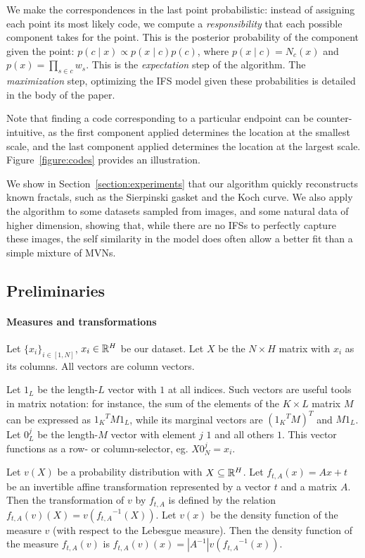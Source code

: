 We make the correspondences in the last point probabilistic: instead of assigning each point its most likely code, we compute a \emph{responsibility} that each possible component takes for the point. This is the posterior probability of the component given the point: $p(c \mid x) \propto p(x \mid c) p(c)$, where $p(x\mid c) = N_c(x)$ and $p(x) = \prod_{s \in c} w_s$. This is the \emph{expectation} step of the algorithm. The \emph{maximization} step, optimizing the IFS model given these probabilities is detailed in the body of the paper. 

Note that finding a code corresponding to a particular endpoint can be counter-intuitive, as the first component applied determines the location at the smallest scale, and the last component applied determines the location at the largest scale. Figure~\ref{figure:codes} provides an illustration.

We show in Section~\ref{section:experiments} that our algorithm quickly reconstructs known fractals, such as the Sierpinski gasket and the Koch curve. We also apply the algorithm to some datasets sampled from images, and some natural data of higher dimension, showing that, while there are no IFSs to perfectly capture these images, the self similarity in the model does often allow a better fit than a simple mixture of MVNs.

\subsection{Preliminaries}
\paragraph{Measures and transformations} Let $\{x_i\}_{i\in[1,N]}$, $x_i\in{\mathbb R}^H$ be our dataset. Let $X$ be the $N\times H$ matrix with $x_i$ as its columns. All vectors are column vectors.  

Let $1_L$ be the length-$L$ vector with $1$ at all indices. Such vectors are useful tools in matrix notation: for instance, the sum of the elements of the $K \times L$ matrix $M$ can be expressed as ${1_K}^T M 1_L$, while its marginal vectors are $({1_K}^T M)^T$ and $M 1_L$. Let $0_L^j$ be the length-$M$ vector with element $j$ $1$ and all others $1$. This vector functions as a row- or column-selector, eg. $X 0^j_N = x_i$.

Let $v(X)$ be a probability distribution with $X \subseteq {\mathbb R}^H$. Let $f_{t, A}(x) = Ax + t$ be an invertible affine transformation represented by a vector $t$ and a matrix $A$. Then the transformation of $v$ by $f_{t, A}$ is defined by the relation $f_{t, A}(v)(X) = v({f_{t, A}}^{-1}(X))$. Let $v(x)$ be the density function of  the measure $v$ (with respect to the Lebesgue measure). Then the density function of the measure $f_{t, A}(v)$ is $f_{t, A}(v)(x) = |A^{-1}| v({f_{t, A}}^{-1}(x))$.

